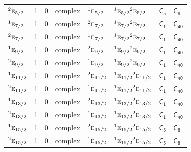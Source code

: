 \documentclass[10pt,a4paper]{article}
\numberwithin{equation}{section}
\newcommand{\grp}[1]{\mathsf{#1}}
\newcommand{\irr}[1]{\text{\normalfont\scshape #1}}
\newcommand{\conjpair}[1]{{}^{#1}}
\begin{document}
{\begin{longtable}{@{}lrrlllll@{}}
$\conjpair{2}\irr{e}_{5/2}$ & 1 & $0$ & complex & $\conjpair{1}\irr{e}_{5/2}$ & $\conjpair{1}\irr{e}_{5/2}\conjpair{2}\irr{e}_{5/2}$ & \href{C5.pdf}{$\grp{C_{5}}$} & \href{../../../rotation/data/pdf/C8.pdf}{$\grp{C_{8}}$}\\
$\conjpair{1}\irr{e}_{7/2}$ & 1 & $0$ & complex & $\conjpair{2}\irr{e}_{7/2}$ & $\conjpair{1}\irr{e}_{7/2}\conjpair{2}\irr{e}_{7/2}$ & \href{C1.pdf}{$\grp{C_{1}}$} & $\grp{C_{40}}$\\
$\conjpair{2}\irr{e}_{7/2}$ & 1 & $0$ & complex & $\conjpair{1}\irr{e}_{7/2}$ & $\conjpair{1}\irr{e}_{7/2}\conjpair{2}\irr{e}_{7/2}$ & \href{C1.pdf}{$\grp{C_{1}}$} & $\grp{C_{40}}$\\
$\conjpair{1}\irr{e}_{9/2}$ & 1 & $0$ & complex & $\conjpair{2}\irr{e}_{9/2}$ & $\conjpair{1}\irr{e}_{9/2}\conjpair{2}\irr{e}_{9/2}$ & \href{C1.pdf}{$\grp{C_{1}}$} & $\grp{C_{40}}$\\
$\conjpair{2}\irr{e}_{9/2}$ & 1 & $0$ & complex & $\conjpair{1}\irr{e}_{9/2}$ & $\conjpair{1}\irr{e}_{9/2}\conjpair{2}\irr{e}_{9/2}$ & \href{C1.pdf}{$\grp{C_{1}}$} & $\grp{C_{40}}$\\
$\conjpair{1}\irr{e}_{11/2}$ & 1 & $0$ & complex & $\conjpair{2}\irr{e}_{11/2}$ & $\conjpair{1}\irr{e}_{11/2}\conjpair{2}\irr{e}_{11/2}$ & \href{C1.pdf}{$\grp{C_{1}}$} & $\grp{C_{40}}$\\
$\conjpair{2}\irr{e}_{11/2}$ & 1 & $0$ & complex & $\conjpair{1}\irr{e}_{11/2}$ & $\conjpair{1}\irr{e}_{11/2}\conjpair{2}\irr{e}_{11/2}$ & \href{C1.pdf}{$\grp{C_{1}}$} & $\grp{C_{40}}$\\
$\conjpair{1}\irr{e}_{13/2}$ & 1 & $0$ & complex & $\conjpair{2}\irr{e}_{13/2}$ & $\conjpair{1}\irr{e}_{13/2}\conjpair{2}\irr{e}_{13/2}$ & \href{C1.pdf}{$\grp{C_{1}}$} & $\grp{C_{40}}$\\
$\conjpair{2}\irr{e}_{13/2}$ & 1 & $0$ & complex & $\conjpair{1}\irr{e}_{13/2}$ & $\conjpair{1}\irr{e}_{13/2}\conjpair{2}\irr{e}_{13/2}$ & \href{C1.pdf}{$\grp{C_{1}}$} & $\grp{C_{40}}$\\
$\conjpair{1}\irr{e}_{15/2}$ & 1 & $0$ & complex & $\conjpair{2}\irr{e}_{15/2}$ & $\conjpair{1}\irr{e}_{15/2}\conjpair{2}\irr{e}_{15/2}$ & \href{C5.pdf}{$\grp{C_{5}}$} & \href{../../../rotation/data/pdf/C8.pdf}{$\grp{C_{8}}$}\\
$\conjpair{2}\irr{e}_{15/2}$ & 1 & $0$ & complex & $\conjpair{1}\irr{e}_{15/2}$ & $\conjpair{1}\irr{e}_{15/2}\conjpair{2}\irr{e}_{15/2}$ & \href{C5.pdf}{$\grp{C_{5}}$} & \href{../../../rotation/data/pdf/C8.pdf}{$\grp{C_{8}}$}\\

\end{longtable}}
\end{document}
